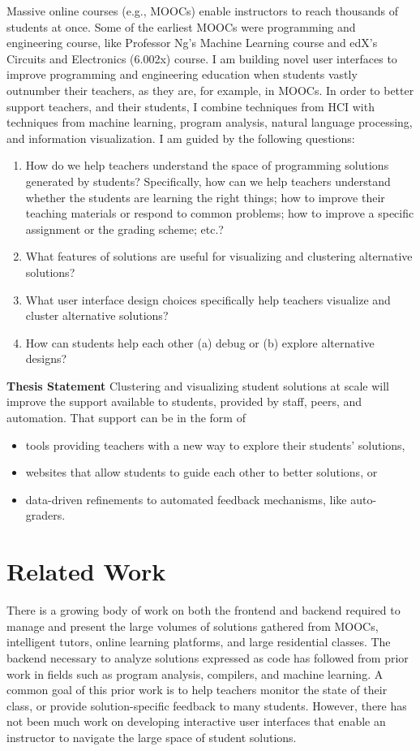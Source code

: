 \documentclass{sigchi}
\begin{document}
Massive online courses (e.g., MOOCs) enable instructors to reach thousands of students at once. Some of the earliest MOOCs were programming and engineering course, like Professor Ng's Machine Learning course and edX's Circuits and Electronics (6.002x) course. I am building novel user interfaces to improve programming and engineering education when students vastly outnumber their teachers, as they are, for example, in MOOCs. In order to better support teachers, and their students, I combine techniques from HCI with techniques from machine learning, program analysis, natural language processing, and information visualization. I am guided by the following questions:
\begin{enumerate}
\item How do we help teachers understand the space of programming solutions generated by students? Specifically, how can we help teachers understand whether the students are learning the right things; how to improve their teaching materials or respond to common problems; how to improve a specific assignment or the grading scheme; etc.?
\item What features of solutions are useful for visualizing and clustering alternative solutions?
\item What user interface design choices specifically help teachers visualize and cluster alternative solutions?
\item How can students help each other (a) debug or (b) explore alternative designs?
\end{enumerate}

{\bf Thesis Statement} Clustering and visualizing student solutions at scale will improve the support available to students, provided by staff, peers, and automation. That support can be in the form of 
\begin{itemize}
\item tools providing teachers with a new way to explore their students' solutions,
\item websites that allow students to guide each other to better solutions, or 
\item data-driven refinements to automated feedback mechanisms, like auto-graders. 
\end{itemize}

\section{Related Work}

There is a growing body of work on both the frontend and backend required to manage and present the large volumes of solutions gathered from MOOCs, intelligent tutors, online learning platforms, and large residential classes. The backend necessary to analyze solutions expressed as code has followed from prior work in fields such as program analysis, compilers, and machine learning. A common goal of this prior work is to help teachers monitor the state of their class, or provide solution-specific feedback to many students. However, there has not been much work on developing interactive user interfaces that enable an instructor to navigate the large space of student solutions.
\end{document}
